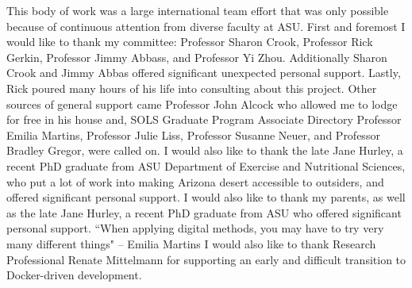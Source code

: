 This body of work was a large international team effort that was only possible because of continuous attention from diverse faculty at ASU. 
\linebreak 
\linebreak 
First and foremost I would like to thank my committee: Professor Sharon Crook, Professor Rick Gerkin, Professor Jimmy Abbass, and Professor Yi Zhou. 
Additionally Sharon Crook and Jimmy Abbas offered significant unexpected personal support.
Lastly, Rick poured many hours of his life into consulting about this project.
\linebreak 
\linebreak 
Other sources of general support came Professor John Alcock who allowed me to lodge for free in his house and, SOLS Graduate Program Associate Directory Professor Emilia Martins, Professor Julie Liss, Professor Susanne Neuer, and Professor Bradley Gregor, were called on.
\linebreak 
\linebreak 
I would also like to thank the late Jane Hurley, a recent PhD graduate from ASU Department of Exercise and Nutritional Sciences, who put a lot of work into making Arizona desert accessible to outsiders, and offered significant personal support.
\linebreak 
\linebreak 
I would also like to thank my parents, as well as the late Jane Hurley, a recent PhD graduate from ASU who offered significant personal support.
\linebreak 
\linebreak 
``When applying digital methods, you may have to try very many different things" -- Emilia Martins
\linebreak 
\linebreak 
I would also like to thank Research Professional Renate Mittelmann for supporting an early and difficult transition to Docker-driven development.
